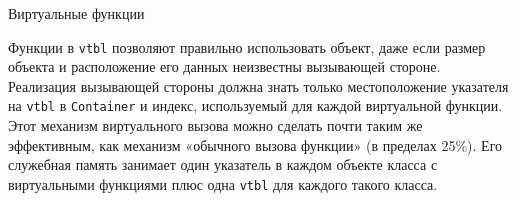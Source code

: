 \documentclass[
    8pt,
    hyperref={pdfencoding=unicode}
    ]{beamer}
\theoremstyle{definition}
\begin{document}
\begin{frame}{Виртуальные функции}
\begin{figure}
\begin{tikzpicture}[align=center,font=\ttfamily]
        \end{tikzpicture}
    \end{figure}
    Функции в \texttt{vtbl} позволяют правильно использовать объект, даже если размер объекта и расположение его данных неизвестны вызывающей стороне. Реализация вызывающей стороны должна знать только местоположение указателя на \texttt{vtbl} в \texttt{Container} и индекс, используемый для каждой виртуальной функции. Этот механизм виртуального вызова можно сделать почти таким же эффективным, как механизм «обычного вызова функции» (в пределах 25\%). Его служебная память занимает один указатель в каждом объекте класса с виртуальными функциями плюс одна \texttt{vtbl} для каждого такого класса.
\end{frame}
\end{document}
